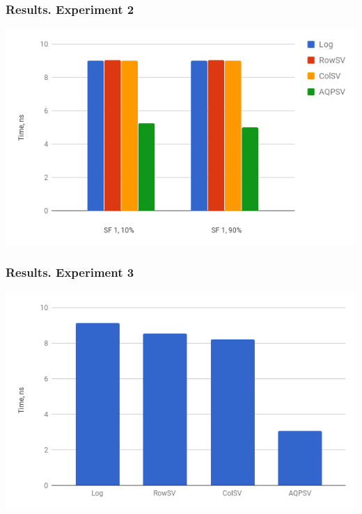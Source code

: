 \documentclass{beamer}
\begin{document}
\begin{frame}
\frametitle{Results. Experiment 2}
\centering
\includegraphics[scale=0.5]{img/exp2.png}
\end{frame}

\begin{frame}
\frametitle{Results. Experiment 3}
\centering
\includegraphics[scale=0.5]{img/exp3.png}
\end{frame}
\end{document}
